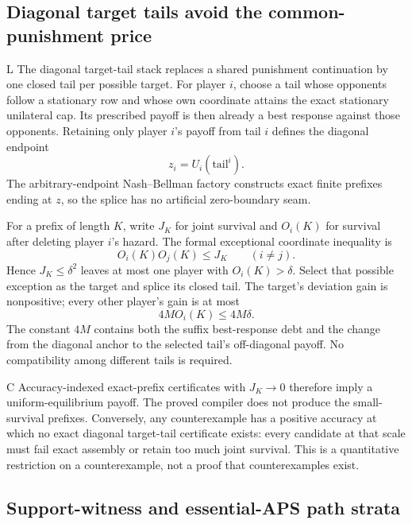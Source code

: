 \documentclass[11pt]{article}
\newcommand{\LTag}{\textsf{L}}
\newcommand{\CTag}{\textsf{C}}
\newcommand{\Prod}{\LTag}
\newcommand{\Cond}{\CTag}
\newcommand{\Status}[1]{#1}
\begin{document}
\subsection{Diagonal target tails avoid the common-punishment price}

\Status{\Prod} The diagonal target-tail stack replaces a shared punishment
continuation by one closed tail per possible target.  For player \(i\), choose
a tail whose opponents follow a stationary row and whose own coordinate
attains the exact stationary unilateral cap.  Its prescribed payoff is then
already a best response against those opponents.  Retaining only player
\(i\)'s payoff from tail \(i\) defines the diagonal endpoint
\[
 z_i=U_i(\text{tail}^i).
\]
The arbitrary-endpoint Nash--Bellman factory constructs exact finite prefixes
ending at \(z\), so the splice has no artificial zero-boundary seam.

For a prefix of length \(K\), write \(J_K\) for joint survival and \(O_i(K)\)
for survival after deleting player \(i\)'s hazard.  The formal exceptional
coordinate inequality is
\[
 O_i(K)O_j(K)\leq J_K\qquad(i\neq j).
\]
Hence \(J_K\leq\delta^2\) leaves at most one player with
\(O_i(K)>\delta\).  Select that possible exception as the target and splice
its closed tail.  The target's deviation gain is nonpositive; every other
player's gain is at most
\[
 4M O_i(K)\leq4M\delta.
\]
The constant \(4M\) contains both the suffix best-response debt and the
change from the diagonal anchor to the selected tail's off-diagonal payoff.
No compatibility among different tails is required.

\Status{\Cond} Accuracy-indexed exact-prefix certificates with
\(J_K\to0\) therefore imply a uniform-equilibrium payoff.  The proved
compiler does not produce the small-survival prefixes.  Conversely, any
counterexample has a positive accuracy at which no exact diagonal target-tail
certificate exists: every candidate at that scale must fail exact assembly or
retain too much joint survival.  This is a quantitative restriction on a
counterexample, not a proof that counterexamples exist.

\subsection{Support-witness and essential-APS path strata}
\end{document}
